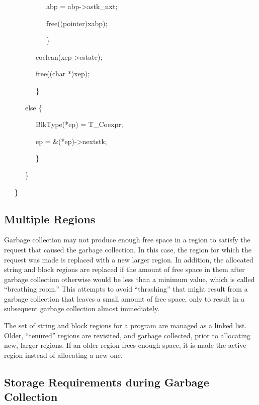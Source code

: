 {\ttfamily\mdseries
\ \ \ \ \ \ \ \ \ \ \ \ abp = abp-{\textgreater}astk\_nxt;
}

{\ttfamily\mdseries
\ \ \ \ \ \ \ \ \ \ \ \ free((pointer)xabp);
}

{\ttfamily\mdseries
\ \ \ \ \ \ \ \ \ \ \ \ \}
}

{\ttfamily\mdseries
\ \ \ \ \ \ \ \ \ coclean(xep-{\textgreater}cstate); }

{\ttfamily\mdseries
\ \ \ \ \ \ \ \ \ free((char *)xep);}

{\ttfamily\mdseries
\ \ \ \ \ \ \ \ \ \}}

{\ttfamily\mdseries
\ \ \ \ \ \ else \{}

{\ttfamily\mdseries
\ \ \ \ \ \ \ \ \ BlkType(*ep) = T\_Coexpr;}

{\ttfamily\mdseries
\ \ \ \ \ \ \ \ \ ep = \&(*ep)-{\textgreater}nextstk;}

{\ttfamily\mdseries
\ \ \ \ \ \ \ \ \ \}}

{\ttfamily\mdseries
\ \ \ \ \ \ \}}

{\ttfamily\mdseries
\ \ \ \}}

\subsection{Multiple Regions}

Garbage collection may not produce enough free space in a region to
satisfy the request that caused the garbage collection. In this case,
the region for which the request was made is replaced with a new
larger region. In addition, the allocated string and block regions are
replaced if the amount of free space in them after garbage collection
otherwise would be less than a minimum value, which is called
``breathing room.'' This attempts to avoid ``thrashing'' that might
result from a garbage collection that leaves a small amount of free
space, only to result in a subsequent garbage collection almost
immediately.

The set of string and block regions for a program are managed as a
linked list. Older, ``tenured'' regions are revisited, and garbage
collected, prior to allocating new, larger regions. If an older region
frees enough space, it is made the active region instead of allocating
a new one.

\subsection{Storage Requirements during Garbage Collection}

